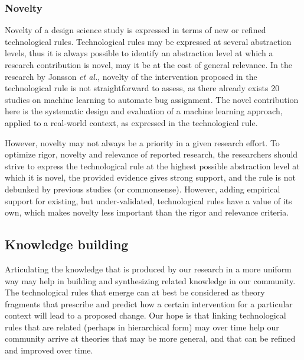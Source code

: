 \documentclass[graybox]{svmult}
\begin{document}
\subsubsection{Novelty %
} 
Novelty of a design science study is expressed in terms of new or refined technological rules. Technological rules may be expressed at several abstraction levels, thus it is always possible to identify an abstraction level at which a research contribution is novel, may it be at the cost of general relevance.  In the research by Jonsson \emph{et al.}, novelty of the intervention proposed in the technological rule is not straightforward to assess, as there already exists 20 studies on machine learning to automate bug assignment. The novel contribution here is the systematic design and evaluation of a machine learning approach, applied to a real-world context, as expressed in the technological rule.

However, novelty may not always be a priority in a given research effort.
To optimize rigor, novelty and relevance of reported research, the researchers should strive to express the technological rule at the highest possible abstraction level at which it is novel, the provided evidence gives strong support, and the rule is not debunked by previous studies (or commonsense). However, adding empirical support for existing, but under-validated, technological rules have a value of its own, which makes novelty less important than the rigor and relevance criteria.


\subsection{Knowledge building}
\label{sec:knowledge}

Articulating the knowledge that is produced by our research in a more uniform way may help in building and synthesizing related knowledge in our community. 
The technological rules that emerge can at best be considered as theory fragments that prescribe and predict how a certain intervention for a particular context will lead to a proposed change. 
Our hope is that linking technological rules that are related (perhaps in hierarchical form) may over time help our community arrive at theories that may be more general, and that can be refined and improved over time. 
\end{document}

